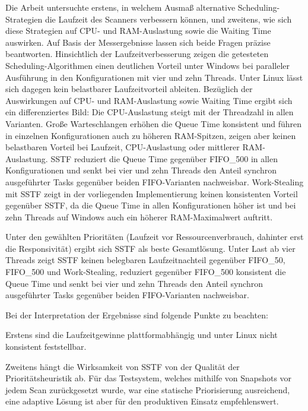 \begin{sloppypar}
\noindent Die Arbeit untersuchte erstens, in welchem Ausmaß alternative Scheduling-Strategien die Laufzeit des Scanners verbessern können, und zweitens, wie sich diese Strategien auf \acs{CPU}- und \acs{RAM}-Auslastung sowie die Waiting Time auswirken. Auf Basis der Messergebnisse lassen sich beide Fragen präzise beantworten. 
Hinsichtlich der Laufzeitverbesserung zeigen die getesteten Scheduling-Algorithmen einen deutlichen Vorteil unter Windows bei paralleler Ausführung in den Konfigurationen mit vier und zehn Threads. 
Unter Linux lässt sich dagegen kein belastbarer Laufzeitvorteil ableiten. 
Bezüglich der Auswirkungen auf \acs{CPU}- und \acs{RAM}-Auslastung sowie Waiting Time ergibt sich ein differenziertes Bild: 
Die \acs{CPU}-Auslastung steigt mit der Threadzahl in allen Varianten. 
Große Warteschlangen erhöhen die Queue Time konsistent und führen in einzelnen Konfigurationen auch zu höheren \acs{RAM}-Spitzen, 
zeigen aber keinen belastbaren Vorteil bei Laufzeit, \acs{CPU}-Auslastung oder mittlerer \acs{RAM}-Auslastung. 
\acs{SSTF} reduziert die Queue Time gegenüber \acs{FIFO}\_500 in allen Konfigurationen und senkt bei vier und zehn Threads den Anteil synchron ausgeführter Tasks gegenüber beiden \acs{FIFO}-Varianten nachweisbar. 
Work-Stealing mit \acs{SSTF} zeigt in der vorliegenden Implementierung keinen konsistenten Vorteil gegenüber \acs{SSTF}, 
da die Queue Time in allen Konfigurationen höher ist und bei zehn Threads auf Windows auch ein höherer \acs{RAM}-Maximalwert auftritt.

\vspace{7.56mm}

\noindent Unter den gewählten Prioritäten (Laufzeit vor Ressourcenverbrauch, dahinter erst die Responsivität) 
ergibt sich \acs{SSTF} als beste Gesamtlösung. 
Unter Last ab vier Threads zeigt \acs{SSTF} keinen belegbaren Laufzeitnachteil gegenüber \acs{FIFO}\_50, \acs{FIFO}\_500 und Work-Stealing, 
reduziert gegenüber \acs{FIFO}\_500 konsistent die Queue Time 
und senkt bei vier und zehn Threads den Anteil synchron ausgeführter Tasks gegenüber beiden \acs{FIFO}-Varianten nachweisbar. 

\vspace{7.56mm}

\noindent Bei der Interpretation der Ergebnisse sind folgende Punkte zu beachten:

\noindent Erstens sind die Laufzeitgewinne plattformabhängig und unter Linux nicht konsistent feststellbar. 

\noindent Zweitens hängt die Wirksamkeit von \acs{SSTF} von der Qualität der Prioritätsheuristik ab. 
Für das Testsystem, welches mithilfe von Snapshots vor jedem Scan zurückgesetzt wurde, 
war eine statische Priorisierung ausreichend, 
eine adaptive Lösung ist aber für den produktiven Einsatz empfehlenswert.


\end{sloppypar}
